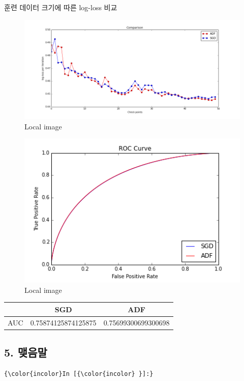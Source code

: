 \documentclass[11pt]{article}
\makeatletter
\def\maxwidth{\ifdim\Gin@nat@width>\linewidth\linewidth
    \else\Gin@nat@width\fi}
\let\Oldincludegraphics\includegraphics
\renewcommand{\includegraphics}[1]{\Oldincludegraphics[width=.8\maxwidth]{#1}}
\makeatother
\begin{document}
    훈련 데이터 크기에 따른 log-loss 비교

    \begin{figure}[htbp]
\centering
\includegraphics{./images/step_vali_comparison_C.png}
\caption{Local image}
\end{figure}

    \begin{figure}[htbp]
\centering
\includegraphics{./images/step_vali_roc_C.png}
\caption{Local image}
\end{figure}

    \begin{longtable}[]{@{}lcc@{}}
\toprule
& SGD & ADF\tabularnewline
\midrule
\endhead
AUC & 0.75874125874125875 & 0.75699300699300698\tabularnewline
\bottomrule
\end{longtable}

    \subsection{5. 맺음말}\label{uxb9fauxc74cuxb9d0}

    \begin{Verbatim}[commandchars=\\\{\}]
{\color{incolor}In [{\color{incolor} }]:}
\end{Verbatim}
\end{document}
